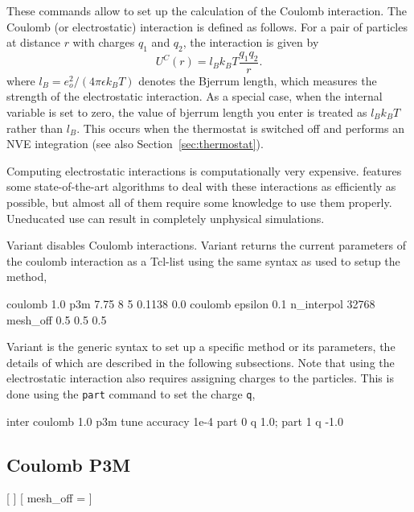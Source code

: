 These commands allow to set up the calculation of the Coulomb
interaction.  The Coulomb (or electrostatic) interaction is defined as
follows.  For a pair of particles at distance $r$ with charges $q_1$
and $q_2$, the interaction is given by
\begin{equation}
  U^C(r)=l_B k_B T\frac{q_1 q_2}{r}.
\end{equation}
where $l_B = e_o^2 / (4 \pi \epsilon k_B T)$ denotes the Bjerrum
length, which measures the strength of the electrostatic interaction.
As a special case, when the internal variable  
is set to zero, the value of bjerrum length you enter 
is treated as $l_B k_B T$ rather than $l_B$. This occurs when the
thermostat is switched off and \es performs an NVE integration
(see also Section~\ref{sec:thermostat}).

Computing electrostatic interactions is computationally very
expensive.  \es{} features some state-of-the-art algorithms to deal
with these interactions as efficiently as possible, but almost all of
them require some knowledge to use them properly.  Uneducated use can
result in completely unphysical simulations.

Variant  disables Coulomb interactions.  Variant
 returns the current parameters of the coulomb interaction
as a Tcl-list using the same syntax as used to setup the method, \eg
\begin{tclcode}
  {coulomb 1.0 p3m 7.75 8 5 0.1138 0.0}
  {coulomb epsilon 0.1 n_interpol 32768 mesh_off 0.5 0.5 0.5}
\end{tclcode}

Variant  is the generic syntax to set up a specific method
or its parameters, the details of which are described in the following
subsections.  Note that using the electrostatic interaction also
requires assigning charges to the particles.  This is done using the
\texttt{part} command to set the charge \texttt{q}, \eg
\begin{tclcode}
  inter coulomb 1.0 p3m tune accuracy 1e-4
  part 0 q 1.0; part 1 q -1.0
\end{tclcode}

\subsection{Coulomb P3M}
\label{sec:coulomb}

\begin{pysyntax}[P3M]
	[
	]
	[
		mesh_off = 
        ]
	\begin{features}
	\end{features}
\end{pysyntax}

